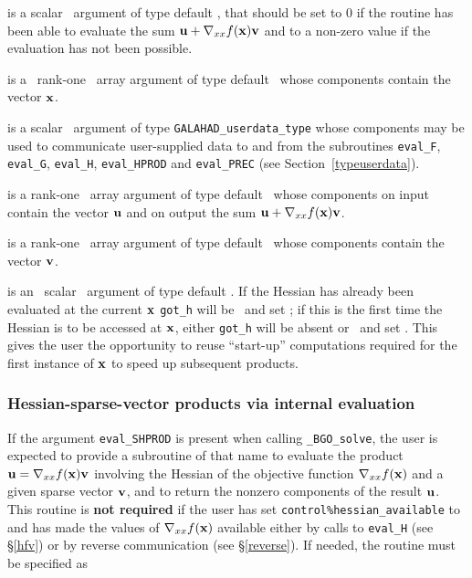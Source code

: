 \documentclass{galahad}
\newcommand{\packagename}{BGO}
\newcommand{\fullpackagename}{\libraryname\_\packagename}
\newcommand{\solver}{{\tt \fullpackagename\_solve}}
\begin{document}
\begin{description}
 is a scalar \intentout\ argument of type default \integer,
that should be set to 0 if the routine has been able to evaluate the
sum ${\mathbf{u}} + \nabla_{xx} f({\mathbf{x}}) {\mathbf{v}}$
and to a non-zero value if the evaluation has not been possible.

 is a \ rank-one \intentin\ array argument of type
default \realdp\ whose components contain the vector ${\mathbf{x}}$.

 is a scalar \intentinout\ argument of type
{\tt GALAHAD\_userdata\_type} whose components may be used
to communicate user-supplied data to and from the
subroutines {\tt eval\_F}, {\tt eval\_G},
{\tt eval\_H}, {\tt eval\_HPROD} and {\tt eval\_PREC}
(see Section~\ref{typeuserdata}).

 is a rank-one \intentinout\ array argument of type default \realdp\
whose components on input contain the vector ${\mathbf{u}}$ and on output the
sum ${\mathbf{u}} + \nabla_{xx} f({\mathbf{x}}) {\mathbf{v}}$.

 is a rank-one \intentin\ array argument of type default \realdp\
whose components contain the vector ${\mathbf{v}}$.

 is an \optional\ scalar \intentin\ argument of type default
\logical. If the Hessian has already been evaluated at the current ${\mathbf{x}}$
{\tt got\_h} will be \present\ and set \true; if this is the first time
the Hessian is to be accessed at ${\mathbf{x}}$, either {\tt got\_h} will be absent
or \present\ and set \false. This gives the user the opportunity
to reuse ``start-up'' computations required for the first instance of
${\mathbf{x}}$ to speed up subsequent products.

\end{description}


\subsubsection{Hessian-sparse-vector products via internal evaluation\label{hvsv}}

If the argument {\tt eval\_SHPROD} is present when calling \solver, the
user is expected to provide a subroutine of that name to evaluate the
product ${\mathbf{u}} = \nabla_{xx} f({\mathbf{x}}) {\mathbf{v}}$ involving 
the Hessian of the objective function $\nabla_{xx} f({\mathbf{x}})$
and a given sparse vector ${\mathbf{v}}$, and to return the nonzero components 
of the result ${\mathbf{u}}$. 
This routine is {\bf not required} if the user has set 
{\tt control\%hessian\_available} to \true\, and has made 
the values of $\nabla_{xx} f({\mathbf{x}})$ available either by calls to 
{\tt eval\_H} (see \S\ref{hfv})
or by reverse communication (see \S\ref{reverse}).
If needed, the routine must be specified as
\end{document}
